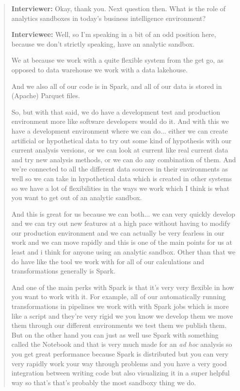\begin{quote}
    \textbf{Interviewer:} Okay, thank you. Next question then. What is the role of analytics sandboxes in today's business intelligence environment?

    \textbf{Interviewee:} Well, so I'm speaking in a bit of an odd position here, because we don't strictly speaking, have an analytic sandbox.

    We at because we work with a quite flexible system from the get go, as opposed to data warehouse we work with a data lakehouse.
    
    And we also all of our code is in Spark, and all of our data is stored in (Apache) Parquet files.
    
    So, but with that said, we do have a development test and production environment more like software developers would do it. 
    And with this we have a development environment where we can do... either we can create artificial or hypothetical data to try out some kind of hypothesis with our current analysis versions, or we can look at current like real current data and try new analysis methods, or we can do any combination of them.
    And we're connected to all the different data sources in their environments as well so we can take in hypothetical data which is created in other systems so we have a lot of flexibilities in the ways we work which I think is what you want to get out of an analytic sandbox.
    
    And this is great for us because we can both... we can very quickly develop and we can try out new features at a high pace without having to modify our production environment and we can actually be very fearless in our work and we can move rapidly and this is one of the main points for us at least and i think for anyone using an analytic sandbox.
    Other than that we do have like the tool we work with for all of our calculations and transformations generally is Spark.
    
    And one of the main perks with Spark is that it's very very flexible in how you want to work with it. 
    For example, all of our automatically running transformations in pipelines we work with with Spark jobs which is more like a script and they're very rigid we you know we develop them we move them through our different environments we test them we publish them.
    But on the other hand you can just as well use Spark with something called the Notebook and that is very much made for an \textit{ad hoc} analysis so you get great performance because Spark is distributed but you can very very rapidly work your way through problems and you have a very good integration between writing code but also visualizing it in a super helpful way so that's that's probably the most sandboxy thing we do.


\end{quote}
